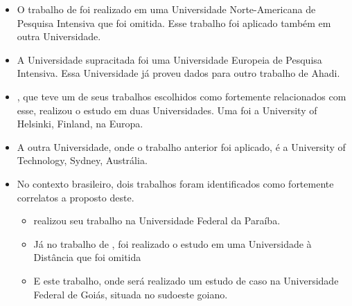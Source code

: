\begin{itemize}
    \item O trabalho de  foi realizado em uma Universidade Norte-Americana de Pesquisa Intensiva que foi omitida. Esse trabalho foi aplicado também em outra Universidade.
    \item A Universidade supracitada foi uma Universidade Europeia de Pesquisa Intensiva. Essa Universidade já proveu dados para outro trabalho de Ahadi.
    \item {}, que teve um de seus trabalhos escolhidos como fortemente relacionados com esse, realizou o estudo em duas Universidades. Uma foi a University of Helsinki, Finland, na Europa.
    \item A outra Universidade, onde o trabalho anterior foi aplicado, é a University of Technology, Sydney, Austrália.
    \item No contexto brasileiro, dois trabalhos foram identificados como fortemente correlatos a proposto deste.
        \begin{itemize}
            \item {} realizou seu trabalho na Universidade Federal da Paraíba.
            \item Já no trabalho de , foi realizado o estudo em uma Universidade à Distância que foi omitida
            \item E este trabalho, onde será realizado um estudo de caso na Universidade Federal de Goiás, situada no sudoeste goiano.
    \end{itemize}
\end{itemize}



